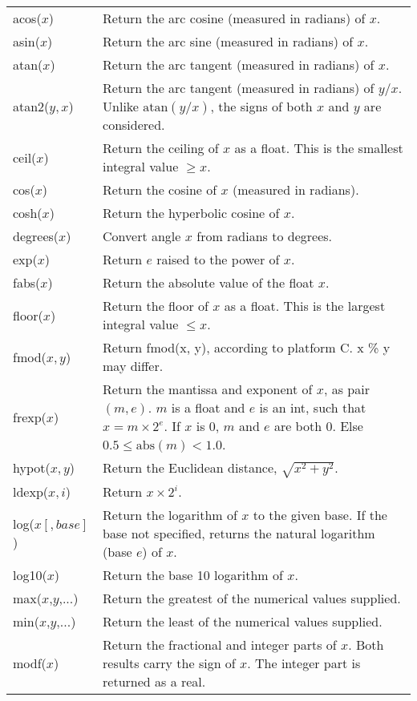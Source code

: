 \begin{table}
\begin{longtable}{|lp{8cm}|}
\hline
acos($x$)&
Return the arc cosine (measured in radians) of $x$.\\
asin($x$)&
Return the arc sine (measured in radians) of $x$.\\
atan($x$)&
Return the arc tangent (measured in radians) of $x$.\\
atan2($y,x$)&
Return the arc tangent (measured in radians) of $y/x$. Unlike $\mathrm{atan}(y/x)$, the signs of both $x$ and $y$ are considered.\\
ceil($x$)&
Return the ceiling of $x$ as a float. This is the smallest integral value $\geq x$.\\
cos($x$)&
Return the cosine of $x$ (measured in radians).\\
cosh($x$)&
Return the hyperbolic cosine of $x$.\\
degrees($x$)&
Convert angle $x$ from radians to degrees.\\
exp($x$)&
Return $e$ raised to the power of $x$.\\
fabs($x$)&
Return the absolute value of the float $x$.\\
floor($x$)&
Return the floor of $x$ as a float. This is the largest integral value $\leq x$.\\
fmod($x,y$)&
Return fmod(x, y), according to platform C.  x \% y may differ.\\
frexp($x$)&
Return the mantissa and exponent of $x$, as pair $(m,e)$. $m$ is a float and $e$ is an int, such that $x = m \times 2^e$. If $x$ is 0, $m$ and $e$ are both 0.  Else $0.5 \leq \mathrm{abs}(m) < 1.0$.\\
hypot($x,y$)&
Return the Euclidean distance, $\sqrt{x^2 + y^2}$.\\
ldexp($x, i$)&
Return $x \times 2^i$. \\
log($x[,base]$)&
Return the logarithm of $x$ to the given base. If the base not specified, returns the natural logarithm (base $e$) of $x$.\\
log10($x$)&
Return the base 10 logarithm of $x$.\\
max($x$,$y$,...)&
Return the greatest of the numerical values supplied.\\
min($x$,$y$,...)&
Return the least of the numerical values supplied.\\
modf($x$)&
Return the fractional and integer parts of $x$.  Both results carry the sign of $x$.  The integer part is returned as a real.\\

\end{longtable}
\end{table}
